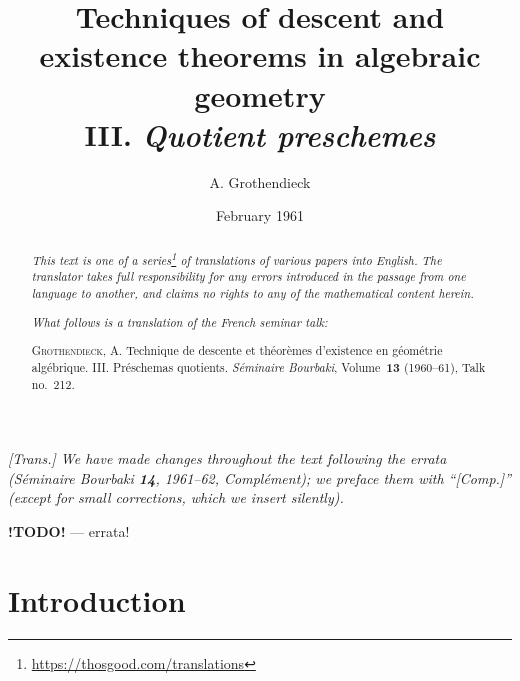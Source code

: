 \documentclass{article}
\title{Techniques of descent and existence theorems in algebraic geometry\\III. \emph{Quotient preschemes}}
\author{A. Grothendieck}
\date{February 1961}
\newcommand{\doctype}{French seminar talk}
\newcommand{\origcit}{%
  \textsc{Grothendieck, A.}
  Technique de descente et th\'{e}or\`{e}mes d'existence en g\'{e}om\'{e}trie alg\'{e}brique. III. Pr\'{e}schemas quotients.
  \emph{S\'{e}minaire Bourbaki}, Volume~\textbf{13} (1960--61), Talk no.~212.%
}
\newcommand{\todo}{\textbf{ !TODO! }}
\newcommand{\oldpage}[1]{\marginpar{\footnotesize$\Big\vert$ \textit{p.~#1}}}
\begin{document}
\maketitle
\thispagestyle{fancy}

\renewcommand{\abstractname}{Translator's note.}

\begin{abstract}
  \renewcommand*{\thefootnote}{\fnsymbol{footnote}}
  \emph{This text is one of a series\footnote{\url{https://thosgood.com/translations}} of translations of various papers into English.}
  \emph{The translator takes full responsibility for any errors introduced in the passage from one language to another, and claims no rights to any of the mathematical content herein.}

  \medskip
  
  \emph{What follows is a translation of the \doctype:}

  \medskip\noindent
  \origcit
\end{abstract}

\setcounter{footnote}{0}

\setcounter{tocdepth}{1}
\tableofcontents



\subsubsection*{}

\emph{[Trans.] We have made changes throughout the text following the errata (\emph{S\'{e}minaire Bourbaki} \textbf{14}, 1961--62, Compl\'{e}ment); we preface them with ``[Comp.]'' (except for small corrections, which we insert silently).}
\medskip


\todo --- errata!

\section*{Introduction}
\oldpage{212-01}
\end{document}
